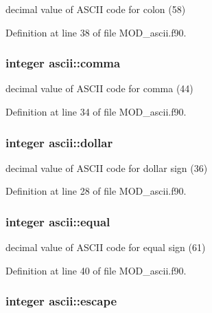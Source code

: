 decimal value of A\-S\-C\-I\-I code for colon (58) 



Definition at line 38 of file M\-O\-D\-\_\-ascii.\-f90.

\hypertarget{classascii_a63814d48f038a8eedffaf01204ae1260}{
\subsubsection[{comma}]{\setlength{\rightskip}{0pt plus 5cm}integer ascii\-::comma}}\label{classascii_a63814d48f038a8eedffaf01204ae1260}


decimal value of A\-S\-C\-I\-I code for comma (44) 



Definition at line 34 of file M\-O\-D\-\_\-ascii.\-f90.

\hypertarget{classascii_a4ddf8a7aeafe0b370f21dbd7e264101f}{
\subsubsection[{dollar}]{\setlength{\rightskip}{0pt plus 5cm}integer ascii\-::dollar}}\label{classascii_a4ddf8a7aeafe0b370f21dbd7e264101f}


decimal value of A\-S\-C\-I\-I code for dollar sign (36) 



Definition at line 28 of file M\-O\-D\-\_\-ascii.\-f90.

\hypertarget{classascii_ae67bd2130d7bf84100186dbc62548d07}{
\subsubsection[{equal}]{\setlength{\rightskip}{0pt plus 5cm}integer ascii\-::equal}}\label{classascii_ae67bd2130d7bf84100186dbc62548d07}


decimal value of A\-S\-C\-I\-I code for equal sign (61) 



Definition at line 40 of file M\-O\-D\-\_\-ascii.\-f90.

\hypertarget{classascii_ae5bdb15e1cbced40c4b1af6a2911af6a}{
\subsubsection[{escape}]{\setlength{\rightskip}{0pt plus 5cm}integer ascii\-::escape}}\label{classascii_ae5bdb15e1cbced40c4b1af6a2911af6a}


